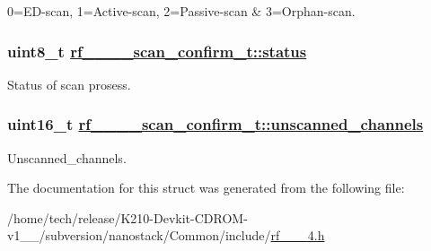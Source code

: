 0=ED-scan, 1=Active-scan, 2=Passive-scan \& 3=Orphan-scan. \hypertarget{structrf__802__15__4__scan__confirm__t_0d370206ccff9f39718af8b79650d437}{
\subsubsection[status]{\setlength{\rightskip}{0pt plus 5cm}uint8\_\-t \hyperlink{structrf__802__15__4__scan__confirm__t_0d370206ccff9f39718af8b79650d437}{rf\_\_\_\_\-scan\_\-confirm\_\-t::status}}}
\label{structrf__802__15__4__scan__confirm__t_0d370206ccff9f39718af8b79650d437}


Status of scan prosess. \hypertarget{structrf__802__15__4__scan__confirm__t_72106d46e0d0caf8217fad75c5a15bfc}{
\subsubsection[unscanned\_\-channels]{\setlength{\rightskip}{0pt plus 5cm}uint16\_\-t \hyperlink{structrf__802__15__4__scan__confirm__t_72106d46e0d0caf8217fad75c5a15bfc}{rf\_\_\_\_\-scan\_\-confirm\_\-t::unscanned\_\-channels}}}
\label{structrf__802__15__4__scan__confirm__t_72106d46e0d0caf8217fad75c5a15bfc}


Unscanned\_\-channels. 

The documentation for this struct was generated from the following file:\begin{CompactItemize}
\item 
/home/tech/release/K210-Devkit-CDROM-v1\_\_/subversion/nanostack/Common/include/\hyperlink{rf__802__15__4_8h}{rf\_\_\_\-4.h}\end{CompactItemize}
